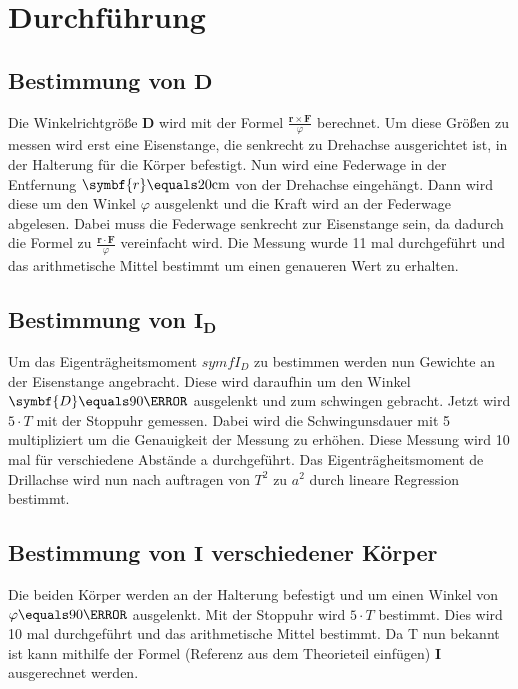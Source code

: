 \section{Durchführung}
\label{sec:Durchführung}
    \subsection{Bestimmung von $\symbf{D}$}
    Die Winkelrichtgröße $\symbf{D}$ wird mit der Formel $\frac{\symbf{r}\times\symbf{F}}{\varphi}$ berechnet.
    Um diese Größen zu messen wird erst eine Eisenstange, die senkrecht zu Drehachse ausgerichtet ist, in der Halterung für die Körper befestigt.
    Nun wird eine Federwage in der Entfernung $\symbf{r}\equals20\unit{\centi\meter}$ von der Drehachse eingehängt.
    Dann wird diese um den Winkel $\varphi$ ausgelenkt und die Kraft wird an der Federwage abgelesen.
    Dabei muss die Federwage senkrecht zur Eisenstange sein, da dadurch die Formel zu $\frac{\symbf{r}\cdot\symbf{F}}{\varphi}$ vereinfacht wird.
    Die Messung wurde 11 mal durchgeführt und das arithmetische Mittel bestimmt um einen genaueren Wert zu erhalten.

    \subsection{Bestimmung von $\symbf{I_D}$}
    Um das Eigenträgheitsmoment $symf{I_D}$ zu bestimmen werden nun Gewichte an der Eisenstange angebracht. 
    Diese wird daraufhin um den Winkel $\symbf{D}\equals90\degree$ ausgelenkt und zum schwingen gebracht.
    Jetzt wird $5 \cdot T$ mit der Stoppuhr gemessen. 
    Dabei wird die Schwingunsdauer mit 5 multipliziert um die Genauigkeit der Messung zu erhöhen. 
    Diese Messung wird 10 mal für verschiedene Abstände a durchgeführt.
    Das Eigenträgheitsmoment de Drillachse wird nun nach auftragen von $T^2$ zu $a^2$ durch lineare Regression bestimmt.

    \subsection{Bestimmung von $\symbf{I}$ verschiedener Körper}
    Die beiden Körper werden an der Halterung befestigt und um einen Winkel von $\varphi\equals90\degree$ ausgelenkt.
    Mit der Stoppuhr wird $5 \cdot T$ bestimmt. 
    Dies wird 10 mal durchgeführt und das arithmetische Mittel bestimmt.
    Da T nun bekannt ist kann mithilfe der Formel (Referenz aus dem Theorieteil einfügen) $\symbf{I}$ ausgerechnet werden.

